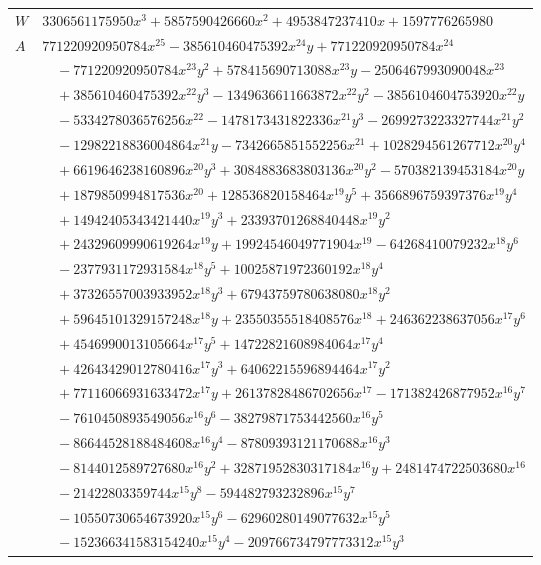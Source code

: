 \documentclass[11pt]{article}
\begin{document}
\begin{longtable}{@{}ll@{}}
$W$ & $3306561175950x^{3}+5857590426660x^{2}+4953847237410x+1597776265980$\\
$A$ & $771220920950784x^{25}-385610460475392x^{24}y+771220920950784x^{24}$\\
 & $\quad -771220920950784x^{23}y^{2}+578415690713088x^{23}y-2506467993090048x^{23}$\\
 & $\quad +385610460475392x^{22}y^{3}-1349636611663872x^{22}y^{2}-3856104604753920x^{22}y$\\
 & $\quad -5334278036576256x^{22}-1478173431822336x^{21}y^{3}-2699273223327744x^{21}y^{2}$\\
 & $\quad -12982218836004864x^{21}y-7342665851552256x^{21}+1028294561267712x^{20}y^{4}$\\
 & $\quad +6619646238160896x^{20}y^{3}+3084883683803136x^{20}y^{2}-570382139453184x^{20}y$\\
 & $\quad +1879850994817536x^{20}+128536820158464x^{19}y^{5}+3566896759397376x^{19}y^{4}$\\
 & $\quad +14942405343421440x^{19}y^{3}+23393701268840448x^{19}y^{2}$\\
 & $\quad +24329609990619264x^{19}y+19924546049771904x^{19}-64268410079232x^{18}y^{6}$\\
 & $\quad -2377931172931584x^{18}y^{5}+10025871972360192x^{18}y^{4}$\\
 & $\quad +37326557003933952x^{18}y^{3}+67943759780638080x^{18}y^{2}$\\
 & $\quad +59645101329157248x^{18}y+23550355518408576x^{18}+246362238637056x^{17}y^{6}$\\
 & $\quad +4546990013105664x^{17}y^{5}+14722821608984064x^{17}y^{4}$\\
 & $\quad +42643429012780416x^{17}y^{3}+64062215596894464x^{17}y^{2}$\\
 & $\quad +77116066931633472x^{17}y+26137828486702656x^{17}-171382426877952x^{16}y^{7}$\\
 & $\quad -7610450893549056x^{16}y^{6}-38279871753442560x^{16}y^{5}$\\
 & $\quad -86644528188484608x^{16}y^{4}-87809393121170688x^{16}y^{3}$\\
 & $\quad -8144012589727680x^{16}y^{2}+32871952830317184x^{16}y+2481474722503680x^{16}$\\
 & $\quad -21422803359744x^{15}y^{8}-594482793232896x^{15}y^{7}$\\
 & $\quad -10550730654673920x^{15}y^{6}-62960280149077632x^{15}y^{5}$\\
 & $\quad -152366341583154240x^{15}y^{4}-209766734797773312x^{15}y^{3}$\\

\end{longtable}
\end{document}
